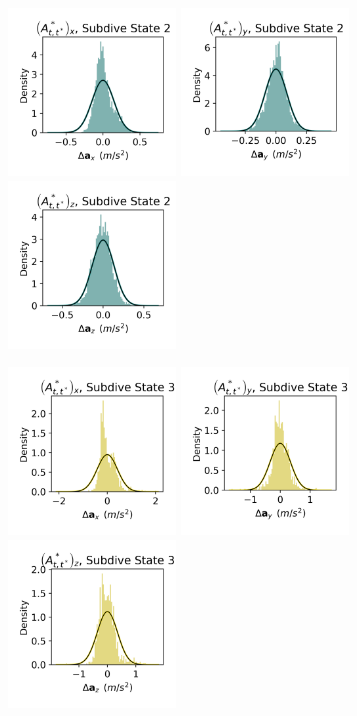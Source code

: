 \documentclass{article}
\begin{document}
\begin{center}
        \includegraphics[width=1.75in]{../Plots/HHMM_empirical_hist_Ax_1.png}
        \includegraphics[width=1.75in]{../Plots/HHMM_empirical_hist_Ay_1.png}
        \includegraphics[width=1.75in]{../Plots/HHMM_empirical_hist_Az_1.png}
        
        \includegraphics[width=1.75in]{../Plots/HHMM_empirical_hist_Ax_2.png}
        \includegraphics[width=1.75in]{../Plots/HHMM_empirical_hist_Ay_2.png}
        \includegraphics[width=1.75in]{../Plots/HHMM_empirical_hist_Az_2.png}
        

\end{center}
\end{document}
